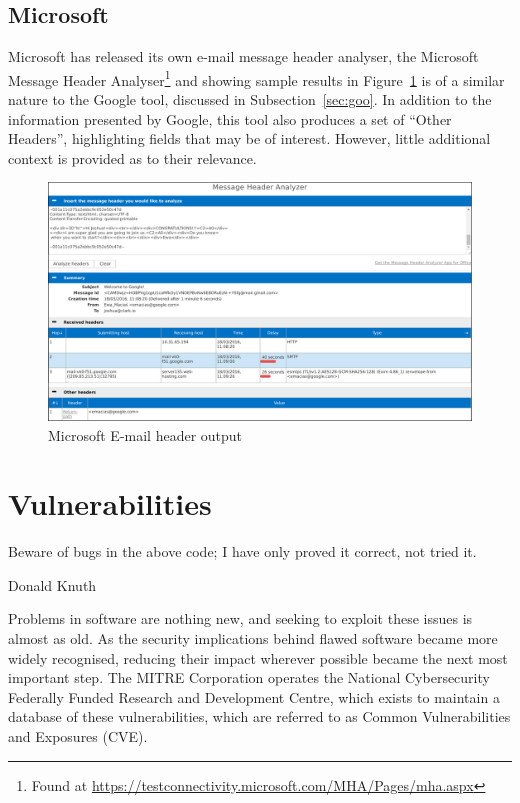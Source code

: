 \subsection{Microsoft}\label{sec:mic}

Microsoft has released its own e-mail message header analyser, the Microsoft
Message Header Analyser\footnote{Found at
	\url{https://testconnectivity.microsoft.com/MHA/Pages/mha.aspx}} and
showing sample results in Figure~\ref{fig:mic} is of a similar nature to the
Google tool, discussed in Subsection~\ref{sec:goo}.  In addition to the
information presented by Google, this tool also produces a set of ``Other
Headers'', highlighting fields that may be of interest.  However, little
additional context is provided as to their relevance.

\begin{figure}

	\centering \includegraphics[width=0.9\linewidth]{microsoft-header}

\caption{Microsoft E-mail header output} \label{fig:mic}\end{figure}

\section{Vulnerabilities}

\epigraph{Beware of bugs in the above code; I have only proved it correct, not
	tried it.}{Donald Knuth}

Problems in software are nothing new, and seeking to exploit these issues is
almost as old.   As the security implications behind flawed software became
more widely recognised, reducing their impact wherever possible became the next
most important step.  The MITRE Corporation operates the National Cybersecurity
Federally Funded Research and Development Centre, which exists to maintain a
database of these vulnerabilities, which are referred to as Common
Vulnerabilities and Exposures (CVE).

